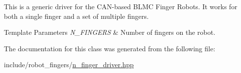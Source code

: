This is a generic driver for the C\+A\+N-\/based B\+L\+MC Finger Robots. It works for both a single finger and a set of multiple fingers.


\begin{DoxyTemplParams}{Template Parameters}
{\em N\+\_\+\+F\+I\+N\+G\+E\+RS} & Number of fingers on the robot. \\
\hline
\end{DoxyTemplParams}


The documentation for this class was generated from the following file\+:\begin{DoxyCompactItemize}
\item 
include/robot\+\_\+fingers/\hyperlink{n__finger__driver_8hpp}{n\+\_\+finger\+\_\+driver.\+hpp}\end{DoxyCompactItemize}
